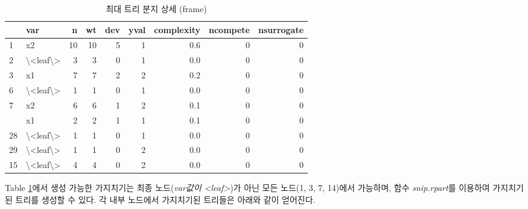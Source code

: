 \documentclass[
]{book}
\newenvironment{Shaded}{\begin{snugshade}}{\end{snugshade}}
\newcommand{\AttributeTok}[1]{\textcolor[rgb]{0.77,0.63,0.00}{#1}}
\newcommand{\ControlFlowTok}[1]{\textcolor[rgb]{0.13,0.29,0.53}{\textbf{#1}}}
\newcommand{\DecValTok}[1]{\textcolor[rgb]{0.00,0.00,0.81}{#1}}
\newcommand{\FunctionTok}[1]{\textcolor[rgb]{0.00,0.00,0.00}{#1}}
\newcommand{\NormalTok}[1]{#1}
\newcommand{\OtherTok}[1]{\textcolor[rgb]{0.56,0.35,0.01}{#1}}
\newcommand{\SpecialCharTok}[1]{\textcolor[rgb]{0.00,0.00,0.00}{#1}}
\newcommand{\StringTok}[1]{\textcolor[rgb]{0.31,0.60,0.02}{#1}}
\begin{document}
\begin{table}

\caption{\label{tab:max-frame}최대 트리 분지 상세 (frame)}
\centering
\begin{tabular}[t]{llrrrrrrr}
\toprule
  & var & n & wt & dev & yval & complexity & ncompete & nsurrogate\\
\midrule
1 & x2 & 10 & 10 & 5 & 1 & 0.6 & 0 & 0\\
2 & \textbackslash{}<leaf\textbackslash{}> & 3 & 3 & 0 & 1 & 0.0 & 0 & 0\\
3 & x1 & 7 & 7 & 2 & 2 & 0.2 & 0 & 0\\
6 & \textbackslash{}<leaf\textbackslash{}> & 1 & 1 & 0 & 1 & 0.0 & 0 & 0\\
7 & x2 & 6 & 6 & 1 & 2 & 0.1 & 0 & 0\\
\addlinespace
14 & x1 & 2 & 2 & 1 & 1 & 0.1 & 0 & 0\\
28 & \textbackslash{}<leaf\textbackslash{}> & 1 & 1 & 0 & 1 & 0.0 & 0 & 0\\
29 & \textbackslash{}<leaf\textbackslash{}> & 1 & 1 & 0 & 2 & 0.0 & 0 & 0\\
15 & \textbackslash{}<leaf\textbackslash{}> & 4 & 4 & 0 & 2 & 0.0 & 0 & 0\\
\bottomrule
\end{tabular}
\end{table}

Table \ref{tab:max-frame}에서 생성 가능한 가지치기는 최종 노드(\emph{var값이 \textless leaf\textgreater{}})가 아닌 모든 노드(1, 3, 7, 14)에서 가능하며, 함수 \emph{snip.rpart}를 이용하여 가지치기 된 트리를 생성할 수 있다. 각 내부 노드에서 가지치기된 트리들은 아래와 같이 얻어진다.

\begin{Shaded}
\end{Shaded}
\end{document}
